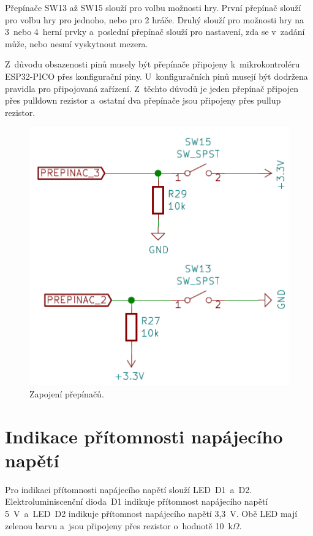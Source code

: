   Přepínače SW13 až SW15 slouží pro volbu možnosti hry. První přepínač slouží pro volbu hry pro jednoho, nebo pro 2 hráče. Druhý 
  slouží pro možnosti hry na 3~nebo 4~herní prvky a~poslední přepínač slouží pro nastavení, zda se v~zadání může, nebo 
  nesmí vyskytnout mezera. 
  
  Z~důvodu obsazenosti pinů musely být přepínače připojeny k~mikrokontroléru ESP32-PICO přes konfigurační piny. U~konfiguračních pinů
  musejí být dodržena pravidla pro připojovaná zařízení.
  Z~těchto důvodů je jeden přepínač připojen přes pulldown rezistor a~ostatní dva přepínače jsou připojeny přes pullup rezistor. 

  \begin{figure}[!h]
    \begin{center}
      \includegraphics[scale=0.6]{obrazky/Prepinace_zapojeni.png}
    \end{center}
    \caption[Zapojení přepínačů]{Zapojení přepínačů.}
  \end{figure}

  \section{Indikace přítomnosti napájecího napětí}
  Pro indikaci přítomnosti napájecího napětí slouží LED~D1~a~D2. Elektroluminiscenční dioda~D1 indikuje přítomnost napájecího napětí 
  5~V~a~LED~D2 indikuje přítomnost napájecího napětí 3,3~V. Obě LED mají zelenou barvu a~jsou připojeny přes
  rezistor o~hodnotě 10~k$\Omega$.

